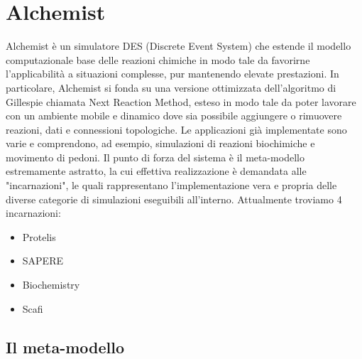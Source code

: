 \documentclass[12pt,a4paper,openright,twoside]{book}
\begin{document}
\section{Alchemist}
Alchemist \cite{Pianini_2013} è un simulatore DES (Discrete Event System) che estende il modello computazionale 
base delle reazioni chimiche in modo tale da favorirne l’applicabilità a situazioni complesse,
pur mantenendo elevate prestazioni. In particolare, Alchemist si fonda su una versione ottimizzata 
dell’algoritmo di Gillespie\cite{gillespie1977exact} chiamata Next Reaction Method\cite{gibson2000efficient}, esteso in modo tale da poter lavorare 
con un ambiente mobile e dinamico dove sia possibile aggiungere o rimuovere reazioni, dati e
connessioni topologiche. Le applicazioni già implementate sono varie e comprendono, ad esempio, 
simulazioni di reazioni biochimiche e movimento di pedoni. Il punto di forza del sistema è il 
meta-modello estremamente astratto, la cui effettiva realizzazione è demandata alle "incarnazioni",
le quali rappresentano l’implementazione vera e propria delle diverse categorie di simulazioni 
eseguibili all’interno. Attualmente troviamo 4 incarnazioni: 
\begin{itemize}
    \item Protelis
    \item SAPERE
    \item Biochemistry
    \item Scafi
\end{itemize}
\subsection{Il meta-modello}
\end{document}
